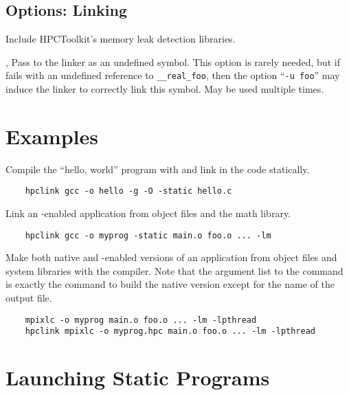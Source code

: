 \documentclass[english]{article}
\begin{document}
\subsection{Options: Linking}

\begin{Description}

\item[\Opt{--memleak}]
Include HPCToolkit's memory leak detection libraries.

\item[\OptArg{-u}{symbol}, \OptArg{--undefined}{symbol}]
Pass  to the linker as an undefined symbol.
This option is rarely needed, but if  fails with an undefined reference to \texttt{\_\_real\_foo}, then the option ``\texttt{-u foo}'' may induce the linker to correctly link this symbol.
May be used multiple times.

\end{Description}


\section{Examples}

Compile the ``hello, world'' program with  and link in the
 code statically.

\begin{verbatim}
    hpclink gcc -o hello -g -O -static hello.c
\end{verbatim}
%
Link an -enabled application from object files and the
math library.

\begin{verbatim}
    hpclink gcc -o myprog -static main.o foo.o ... -lm
\end{verbatim}
%
Make both native and -enabled versions of an application from object files and system libraries with the  compiler.
Note that the argument list to the  command is exactly the command to build the native version except for the name of the output file.

\begin{verbatim}
    mpixlc -o myprog main.o foo.o ... -lm -lpthread
    hpclink mpixlc -o myprog.hpc main.o foo.o ... -lm -lpthread
\end{verbatim}


\section{Launching Static Programs}
\end{document}

